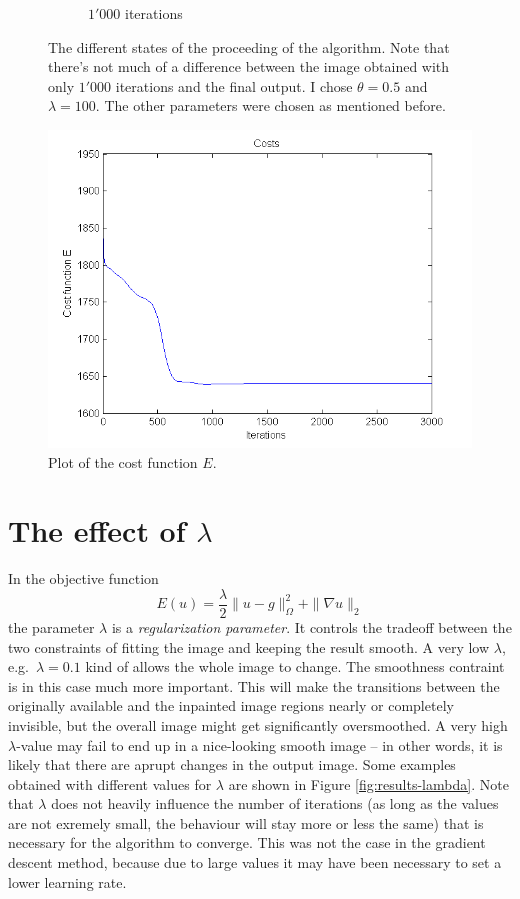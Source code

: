 \documentclass{paper}
\begin{document}
\begin{figure}[H]
\begin{subfigure}[ht]{0.3\textwidth}
	\caption*{$1'000$ iterations}
\end{subfigure}
\caption{The different states of the proceeding of the algorithm. Note that there's not much of a difference between the image obtained with only $1'000$ iterations and the final output. I chose $\theta = 0.5$ and $\lambda = 100$. The other parameters were chosen as mentioned before.}
\label{fig:results-cat}
\end{figure}

\begin{figure}[ht]
 \centering
 \includegraphics[width=\textwidth]{plot-costs}
  \caption{Plot of the cost function $E$.}
 \label{fig:plot-costs}
\end{figure}


\section{The effect of $\lambda$}
In the objective function
$$E(u) = \frac{\lambda}{2} \|u-g\|_\Omega^2 + \|\nabla u \|_2$$
the parameter $\lambda$ is a \emph{regularization parameter}. It controls the tradeoff between the two constraints of fitting the image and keeping the result smooth. 
A very low $\lambda$, e.g.\ $\lambda = 0.1$ kind of allows the whole image to change. The smoothness contraint is in this case much more important. 
This will make the transitions between the originally available and the inpainted image regions nearly or completely invisible, but the overall image might get significantly oversmoothed. 
A very high $\lambda$-value may fail to end up in a nice-looking smooth image -- in other words, it is likely that there are aprupt changes in the output image. 
Some examples obtained with different values for $\lambda$ are shown in Figure \ref{fig:results-lambda}. Note that $\lambda$ does not heavily influence the number of iterations (as long as the values are not exremely small, the behaviour will stay more or less the same) that is necessary for the algorithm to converge. This was not the case in the gradient descent method, because due to large values it may have been necessary to set a lower learning rate. 
\end{document}
